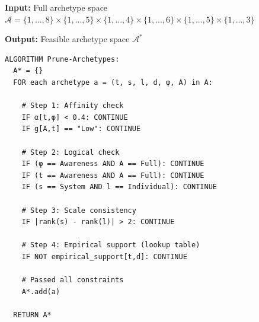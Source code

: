 \begin{tcolorbox}[colback=orange!5!white, colframe=orange!75!black,
    title=\textbf{Algorithm HHH-A1: Feasibility Pruning}]

\textbf{Input:} Full archetype space $\mathcal{A} = \{1,...,8\} \times \{1,...,5\} \times \{1,...,4\} \times \{1,...,6\} \times \{1,...,5\} \times \{1,...,3\}$

\textbf{Output:} Feasible archetype space $\mathcal{A}^*$

\begin{verbatim}
ALGORITHM Prune-Archetypes:
  A* = {}
  FOR each archetype a = (t, s, l, d, φ, A) in A:

    # Step 1: Affinity check
    IF α[t,φ] < 0.4: CONTINUE
    IF g[A,t] == "Low": CONTINUE

    # Step 2: Logical check
    IF (φ == Awareness AND A == Full): CONTINUE
    IF (t == Awareness AND A == Full): CONTINUE
    IF (s == System AND l == Individual): CONTINUE

    # Step 3: Scale consistency
    IF |rank(s) - rank(l)| > 2: CONTINUE

    # Step 4: Empirical support (lookup table)
    IF NOT empirical_support[t,d]: CONTINUE

    # Passed all constraints
    A*.add(a)

  RETURN A*
\end{verbatim}

\end{tcolorbox}

